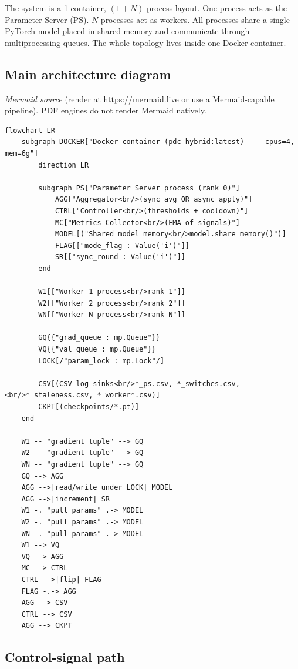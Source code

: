 \documentclass[11pt,a4paper]{article}
\begin{document}
The system is a 1-container, $(1{+}N)$-process layout. One process acts as the Parameter Server (PS). $N$ processes act as workers. All processes share a single PyTorch model placed in shared memory and communicate through multiprocessing queues. The whole topology lives inside one Docker container.

\subsection{Main architecture diagram}

\textit{Mermaid source} (render at \url{https://mermaid.live} or use a Mermaid-capable pipeline). PDF engines do not render Mermaid natively.

\begin{lstlisting}[style=mermaid, caption={Main architecture (Mermaid flowchart)}]
flowchart LR
    subgraph DOCKER["Docker container (pdc-hybrid:latest)  —  cpus=4, mem=6g"]
        direction LR

        subgraph PS["Parameter Server process (rank 0)"]
            AGG["Aggregator<br/>(sync avg OR async apply)"]
            CTRL["Controller<br/>(thresholds + cooldown)"]
            MC["Metrics Collector<br/>(EMA of signals)"]
            MODEL[("Shared model memory<br/>model.share_memory()")]
            FLAG[["mode_flag : Value('i')"]]
            SR[["sync_round : Value('i')"]]
        end

        W1[["Worker 1 process<br/>rank 1"]]
        W2[["Worker 2 process<br/>rank 2"]]
        WN[["Worker N process<br/>rank N"]]

        GQ{{"grad_queue : mp.Queue"}}
        VQ{{"val_queue : mp.Queue"}}
        LOCK[/"param_lock : mp.Lock"/]

        CSV[(CSV log sinks<br/>*_ps.csv, *_switches.csv,<br/>*_staleness.csv, *_worker*.csv)]
        CKPT[(checkpoints/*.pt)]
    end

    W1 -- "gradient tuple" --> GQ
    W2 -- "gradient tuple" --> GQ
    WN -- "gradient tuple" --> GQ
    GQ --> AGG
    AGG -->|read/write under LOCK| MODEL
    AGG -->|increment| SR
    W1 -. "pull params" .-> MODEL
    W2 -. "pull params" .-> MODEL
    WN -. "pull params" .-> MODEL
    W1 --> VQ
    VQ --> AGG
    MC --> CTRL
    CTRL -->|flip| FLAG
    FLAG -.-> AGG
    AGG --> CSV
    CTRL --> CSV
    AGG --> CKPT
\end{lstlisting}

\subsection{Control-signal path}
\end{document}
